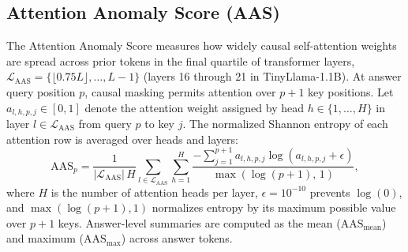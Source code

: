 \documentclass{ieeeaccess}
\begin{document}
\subsection{Attention Anomaly Score (AAS)}
The Attention Anomaly Score measures how widely causal self-attention weights are spread across prior tokens in the final quartile of transformer layers, $\mathcal{L}_{\text{AAS}} = \{\lfloor 0.75 L \rfloor, \dots, L - 1\}$ (layers 16 through 21 in TinyLlama-1.1B). At answer query position $p$, causal masking permits attention over $p + 1$ key positions. Let $a_{l,h,p,j} \in [0, 1]$ denote the attention weight assigned by head $h \in \{1, \dots, H\}$ in layer $l \in \mathcal{L}_{\text{AAS}}$ from query $p$ to key $j$. The normalized Shannon entropy of each attention row is averaged over heads and layers:
\begin{equation}
\text{AAS}_p = \frac{1}{|\mathcal{L}_{\text{AAS}}|\, H} \sum_{l \in \mathcal{L}_{\text{AAS}}} \sum_{h=1}^{H} \frac{-\sum_{j=1}^{p+1} a_{l,h,p,j} \log\!\left(a_{l,h,p,j} + \epsilon\right)}{\max(\log(p+1),\, 1)},
\label{eq:aas}
\end{equation}
where $H$ is the number of attention heads per layer, $\epsilon = 10^{-10}$ prevents $\log(0)$, and $\max(\log(p+1), 1)$ normalizes entropy by its maximum possible value over $p + 1$ keys. Answer-level summaries are computed as the mean ($\text{AAS}_{\text{mean}}$) and maximum ($\text{AAS}_{\text{max}}$) across answer tokens.
\end{document}
